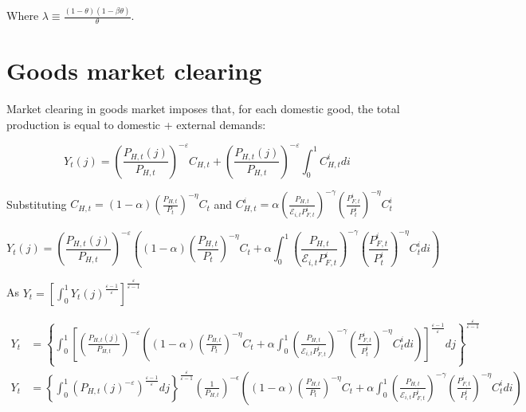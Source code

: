 \documentclass{article}
\begin{document}
Where $\lambda \equiv \frac{(1-\theta) (1 - \beta \theta)}{\theta}$.

\section{Goods market clearing}
Market clearing in goods market imposes that, for each domestic good, the total production is equal to domestic + external demands:

\begin{equation}
    Y_{t}(j) = \left( \frac{P_{H,t}(j)}{P_{H,t}} \right)^{-\varepsilon} C_{H,t} + \left( \frac{P_{H,t}(j)}{P_{H,t}} \right)^{-\varepsilon} \int_0^1 C^i_{H, t} di
\end{equation}

Substituting $C_{H,t} = (1-\alpha) \left( \frac{P_{H,t}}{P_t} \right)^{-\eta} C_t$ and $C^i_{H,t} = \alpha \left( \frac{P_{H,t}}{\mathcal{E}_{i,t} P^i_{F,t}} \right)^{-\gamma} \left( \frac{P^i_{F,t}}{P^i_{t}} \right)^{-\eta} C^i_t$

\begin{equation}
    Y_{t}(j) = \left( \frac{P_{H,t}(j)}{P_{H,t}} \right)^{-\varepsilon} \left((1-\alpha) \left( \frac{P_{H,t}}{P_t} \right)^{-\eta} C_t +  \alpha \int_0^1 \left( \frac{P_{H,t}}{\mathcal{E}_{i,t} P^i_{F,t}} \right)^{-\gamma} \left( \frac{P^i_{F,t}}{P^i_{t}} \right)^{-\eta} C^i_t di \right)
\end{equation}

As $Y_t = \left[\int^1_0 Y_t(j)^{\frac{\varepsilon-1}{\varepsilon}} \right]^\frac{\varepsilon}{\varepsilon-1}$

\begin{equation}
    \label{}
    \begin{split}
    Y_{t} &= \left\{ \int^1_0 \left[ \left( \frac{P_{H,t}(j)}{P_{H,t}} \right)^{-\varepsilon} \left((1-\alpha) \left( \frac{P_{H,t}}{P_t} \right)^{-\eta} C_t +  \alpha \int_0^1 \left( \frac{P_{H,t}}{\mathcal{E}_{i,t} P^i_{F,t}} \right)^{-\gamma} \left( \frac{P^i_{F,t}}{P^i_{t}} \right)^{-\eta} C^i_t di \right)\right]^{\frac{\varepsilon-1}{\varepsilon}}dj \right\}^\frac{\varepsilon}{\varepsilon-1}\\
    Y_{t} &= \left\{ \int^1_0 \left( P_{H,t}(j)^{-\varepsilon} \right)^{\frac{\varepsilon-1}{\varepsilon}}dj \right\}^\frac{\varepsilon}{\varepsilon-1} \left(\frac{1}{P_{H,t}}\right)^{-\epsilon} \left((1-\alpha) \left( \frac{P_{H,t}}{P_t} \right)^{-\eta} C_t +  \alpha \int_0^1 \left( \frac{P_{H,t}}{\mathcal{E}_{i,t} P^i_{F,t}} \right)^{-\gamma} \left( \frac{P^i_{F,t}}{P^i_{t}} \right)^{-\eta} C^i_t di \right)
    \end{split}
\end{equation}
\end{document}
